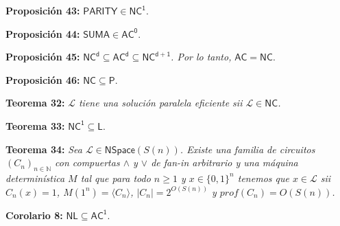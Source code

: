 \documentclass{article}
\begin{document}
\begin{flushleft}
  \textbf{Proposición 43:}
  $\mathsf{PARITY \in NC^1}$.
\end{flushleft}

\begin{flushleft}
  \textbf{Proposición 44:}
  $\mathsf{SUMA \in AC^0}$.
\end{flushleft}

\begin{flushleft}
  \textbf{Proposición 45:}
  $\mathsf{NC^d \subseteq AC^d \subseteq NC^{d+1}}$\textit{. Por lo tanto,} $\mathsf{AC = NC}$.
\end{flushleft}

\begin{flushleft}
  \textbf{Proposición 46:}
  $\mathsf{NC \subseteq P}$.
\end{flushleft}

\begin{flushleft}
  \textbf{Teorema 32:}
  \textit{$\mathcal{L}$ tiene una solución paralela eficiente sii $\mathcal{L} \in \mathsf{NC}$.}
\end{flushleft}

\begin{flushleft}
  \textbf{Teorema 33:}
  $\mathsf{NC^1 \subseteq L}$.
\end{flushleft}

\begin{flushleft}
  \textbf{Teorema 34:}
  \textit{Sea $\mathcal{L}\in \mathsf{NSpace}(S(n))$. Existe una familia de circuitos $(C_n)_{n \in \mathbb{N}}$ 
  con compuertas $\land$ y $\lor$ de fan-in arbitrario y una máquina determinística $M$ tal que para todo
  $n \geq 1$ y $x \in \{0,1\}^n$ tenemos que $x \in \mathcal{L}$ sii $C_n(x) = 1$, $M (1^n) = \langle C_n \rangle$,
  $|C_n| = 2^{O(S(n))}$ y $prof(C_n) = O(S(n))$.}
\end{flushleft}

\begin{flushleft}
  \textbf{Corolario 8:}
  $\mathsf{NL \subseteq AC^1}$.
\end{flushleft}
\end{document}
